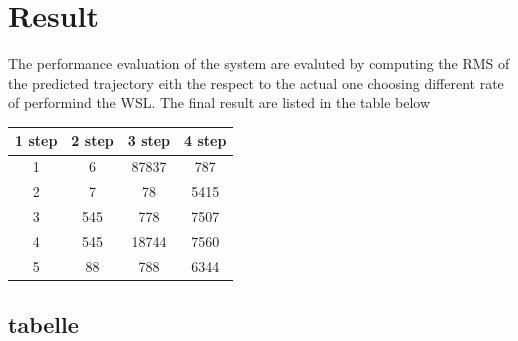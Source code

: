 \documentclass[twocolumn]{article}
\begin{document}
    \section*{Result}
    The performance evaluation of the system are evaluted by computing the RMS of the predicted trajectory eith the respect to the actual one
    choosing different rate of performind the WSL. The final result are listed in the table below


    \begin{center}
        \begin{tabular}{||c c c c||}
            \hline
            1 step & 2 step & 3 step & 4 step \\ [0.5ex]
            \hline\hline
            1      & 6      & 87837  & 787    \\
            \hline
            2      & 7      & 78     & 5415   \\
            \hline
            3      & 545    & 778    & 7507   \\
            \hline
            4      & 545    & 18744  & 7560   \\
            \hline
            5      & 88     & 788    & 6344   \\ [1ex]
            \hline
        \end{tabular}
    \end{center}


    \subsection*{tabelle}
\end{document}
